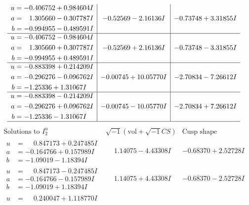 \documentclass[1p]{elsarticle_modified}
\theoremstyle{definition}
\newcommand{\I}{\sqrt{-1}}
\begin{document}
$$\begin{array}{c|c|c}
\begin{aligned}
u &= -0.406752 + 0.984604 I \\
a &= \phantom{-}1.305660 - 0.307787 I \\
b &= -0.994955 - 0.489591 I\end{aligned}
 & -0.52569 - 2.16136 I & -0.73748 + 3.31855 I \\ \hline\begin{aligned}
u &= -0.406752 - 0.984604 I \\
a &= \phantom{-}1.305660 + 0.307787 I \\
b &= -0.994955 + 0.489591 I\end{aligned}
 & -0.52569 + 2.16136 I & -0.73748 - 3.31855 I \\ \hline\begin{aligned}
u &= -0.883398 + 0.214209 I \\
a &= -0.296276 - 0.096762 I \\
b &= -1.25336 + 1.31067 I\end{aligned}
 & -0.00745 + 10.05770 I & -2.70834 - 7.26612 I \\ \hline\begin{aligned}
u &= -0.883398 - 0.214209 I \\
a &= -0.296276 + 0.096762 I \\
b &= -1.25336 - 1.31067 I\end{aligned}
 & -0.00745 - 10.05770 I & -2.70834 + 7.26612 I\\
 \hline 
 \end{array}$$\newpage$$\begin{array}{c|c|c}  
\text{Solutions to }I^u_{2}& \I (\text{vol} + \sqrt{-1}CS) & \text{Cusp shape}\\
 \hline 
\begin{aligned}
u &= \phantom{-}0.847173 + 0.247485 I \\
a &= -0.164766 + 0.157989 I \\
b &= -1.09019 - 1.18394 I\end{aligned}
 & \phantom{-}1.14075 - 4.43308 I & -0.68370 + 2.52728 I \\ \hline\begin{aligned}
u &= \phantom{-}0.847173 - 0.247485 I \\
a &= -0.164766 - 0.157989 I \\
b &= -1.09019 + 1.18394 I\end{aligned}
 & \phantom{-}1.14075 + 4.43308 I & -0.68370 - 2.52728 I \\ \hline\begin{aligned}
u &= \phantom{-}0.240047 + 1.118770 I \\

\end{aligned}
\end{array}$$
\end{document}

